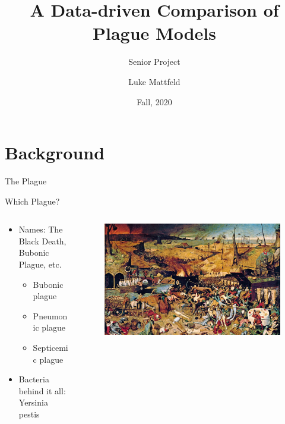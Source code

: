 \documentclass[t,10pt,fleqn]{beamer}
\title[DDCPM]%
			{A Data-driven Comparison of Plague Models}
\subtitle{Senior Project}
\author[Luke Mattfeld]{Luke Mattfeld}
\institute[EWU]{Eastern Washington University}
\date{Fall, 2020}
\begin{document}
\begin{frame}
	\titlepage

\end{frame}
\section{Background}
\begin{frame}{The Plague}
	\vspace{-.3cm}
	\begin{block}{Which Plague?}
		\begin{columns}
			\begin{column}{0.40\textwidth}
				\begin{itemize}
					\item Names: The Black Death, Bubonic Plague, etc.
					      \pause
					      \begin{itemize}
						      \pause
						      \item Bubonic plague
						            \pause
						      \item Pneumonic plague
						            \pause
						      \item Septicemic plague
						            \pause
						            \\
					      \end{itemize}
					\item Bacteria behind it all: Yersinia pestis
					      \\
				\end{itemize}
			\end{column}
			\begin{column}{0.55\textwidth}
				\onslide
				\begin{figure}
					\includegraphics[width=\linewidth]{triumph-of-death.jpg}

\end{figure}
\end{column}
\end{columns}
\end{block}
\end{frame}
\end{document}
